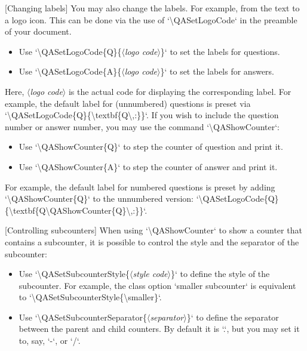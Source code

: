 \documentclass[%
  use style = classical,
  scroll,
]{Q-and-A}
\newcommand{\meta}[1]{$\langle${\normalfont\itshape#1}$\rangle$}
\begin{document}
  [Changing labels]
  You may also change the labels. For example, from the text  to a logo icon. This can be done via the use of `\textbackslash QASetLogoCode` in the preamble of your document.
  \begin{itemize}
    \item Use `\textbackslash QASetLogoCode\{Q\}\{\meta{logo code}\}` to set the labels for questions.
    \item Use `\textbackslash QASetLogoCode\{A\}\{\meta{logo code}\}` to set the labels for answers.
  \end{itemize}
  Here, \meta{logo code} is the actual code for displaying the corresponding label. For example, the default label for (unnumbered) questions is preset via `\textbackslash QASetLogoCode\{Q\}\{\textbackslash textbf\{Q\textbackslash,:\}\}`.
  If you wish to include the question number or answer number, you may use the command `\textbackslash QAShowCounter`:
  \begin{itemize}
    \item Use `\textbackslash QAShowCounter\{Q\}` to step the counter of question and print it.
    \item Use `\textbackslash QAShowCounter\{A\}`  to step the counter of answer and print it.
  \end{itemize}
  For example, the default label for numbered questions is preset by adding `\textbackslash QAShowCounter\{Q\}` to the unnumbered version: `\textbackslash QASetLogoCode\{Q\}\{\textbackslash textbf\{Q\textbackslash QAShowCounter\{Q\}\textbackslash,:\}\}`.

  [Controlling subcounters]
  When using `\textbackslash QAShowCounter` to show a counter that contains a subcounter, it is possible to control the style and the separator of the subcounter:
  \begin{itemize}
    \item Use `\textbackslash QASetSubcounterStyle\{\meta{style code}\}` to define the style of the subcounter. For example, the class option `smaller subcounter` is equivalent to `\textbackslash QASetSubcounterStyle\{\textbackslash smaller\}`.
    \item Use `\textbackslash QASetSubcounterSeparator\{\meta{separator}\}` to define the separator between the parent and child counters. By default it is `.`, but you may set it to, say, `-`, or `/`.
  \end{itemize}
\end{document}
